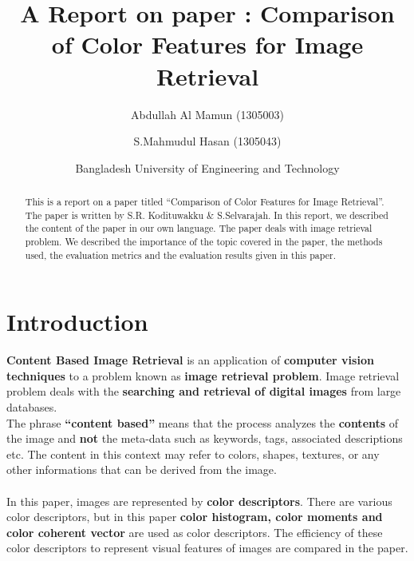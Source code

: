 \documentclass[pstricks,10pt,notitlepage]{report}
\title{A Report on paper : Comparison of Color Features for Image Retrieval}
\author{
  Abdullah Al Mamun (1305003)
  \and
  S.Mahmudul Hasan (1305043)
  \and
  \small{Bangladesh University of Engineering and Technology}
  }
\date{}
\begin{document}
\maketitle

\begin{abstract}
This is a report on a paper titled ``Comparison of Color Features for Image Retrieval''. The paper is written by S.R. Kodituwakku \& S.Selvarajah. In this report, we described the content of the paper in our own language. The paper deals with image retrieval problem. We described the importance of the topic covered in the paper, the methods used, the evaluation metrics and the evaluation results given in this paper.
\end{abstract}


\section{Introduction}

\textbf{Content Based Image Retrieval}  is an application of \textbf{computer vision 
techniques} to a problem known as \textbf{image retrieval problem}. Image retrieval 
problem deals with the \textbf{searching and retrieval of digital images} from 
large databases.\\
\newline
The phrase \textbf{“content based”} means that the process analyzes the \textbf{contents} 
of the image and \textbf{not} the meta-data such as keywords, tags, associated 
descriptions etc. The content in this context may refer to colors, 
shapes, textures, or any other informations that can be derived from the image.\\
\\
In this paper, images are represented by \textbf{color descriptors}. There are various color descriptors, but in this paper \textbf{color histogram, color moments and color coherent vector} are used as color descriptors. The efficiency of these color descriptors to represent visual features of images are compared in the paper. 
\end{document}
